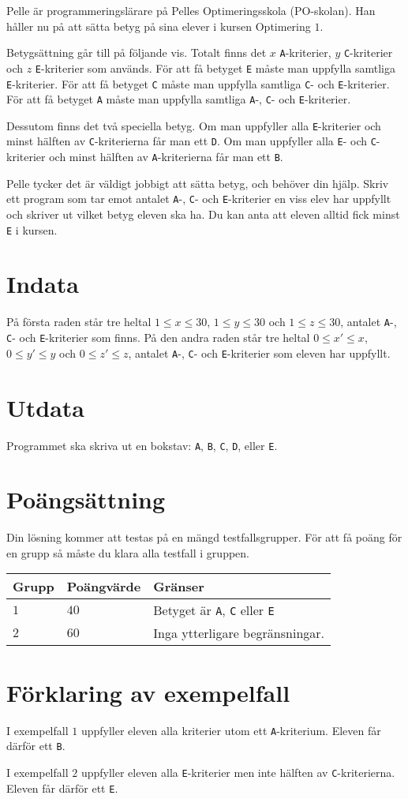 Pelle är programmeringslärare på Pelles Optimeringsskola (PO-skolan).
Han håller nu på att sätta betyg på sina elever i kursen Optimering $1$.

Betygsättning går till på följande vis.
Totalt finns det $x$ \texttt{A}-kriterier, $y$ \texttt{C}-kriterier och $z$ \texttt{E}-kriterier som används.
För att få betyget \texttt{E} måste man uppfylla samtliga \texttt{E}-kriterier.
För att få betyget \texttt{C} måste man uppfylla samtliga \texttt{C}- och \texttt{E}-kriterier.
För att få betyget \texttt{A} måste man uppfylla samtliga \texttt{A}-, \texttt{C}- och \texttt{E}-kriterier.

Dessutom finns det två speciella betyg.
Om man uppfyller alla \texttt{E}-kriterier och minst hälften av \texttt{C}-kriterierna får man ett \texttt{D}.
Om man uppfyller alla \texttt{E}- och \texttt{C}-kriterier och minst hälften av \texttt{A}-kriterierna får man ett \texttt{B}.

Pelle tycker det är väldigt jobbigt att sätta betyg, och behöver din hjälp.
Skriv ett program som tar emot antalet \texttt{A}-, \texttt{C}- och \texttt{E}-kriterier en viss elev har uppfyllt och skriver ut vilket betyg eleven ska ha.
Du kan anta att eleven alltid fick minst \texttt{E} i kursen.

\section*{Indata}
På första raden står tre heltal $1 \leq x \leq 30$, $1 \leq y \leq 30$ och $1 \leq z \leq 30$, antalet \texttt{A}-, \texttt{C}- och \texttt{E}-kriterier som finns.
På den andra raden står tre heltal $0 \leq x' \leq x$, $0 \leq y' \leq y$ och $0 \leq z' \leq z$, antalet \texttt{A}-, \texttt{C}- och \texttt{E}-kriterier som eleven har uppfyllt.

\section*{Utdata}
Programmet ska skriva ut en bokstav: \texttt{A}, \texttt{B}, \texttt{C}, \texttt{D}, eller \texttt{E}.

\section*{Poängsättning}
Din lösning kommer att testas på en mängd testfallsgrupper.
För att få poäng för en grupp så måste du klara alla testfall i gruppen.

\noindent
\begin{tabular}{| l | l | l |}
\hline
Grupp & Poängvärde & Gränser \\ \hline
$1$     & $40$        &  Betyget är \texttt{A}, \texttt{C} eller \texttt{E} \\ \hline 
$2$     & $60$        &  Inga ytterligare begränsningar. \\ \hline
\end{tabular}

\section*{Förklaring av exempelfall}
I exempelfall $1$ uppfyller eleven alla kriterier utom ett \texttt{A}-kriterium. Eleven får därför ett \texttt{B}.

I exempelfall $2$ uppfyller eleven alla \texttt{E}-kriterier men inte hälften av \texttt{C}-kriterierna. Eleven får därför ett \texttt{E}.

